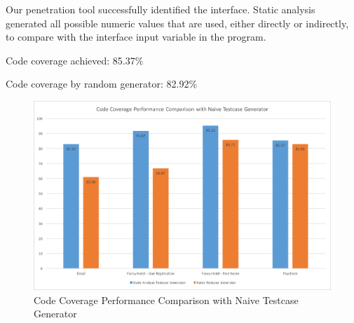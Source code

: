 Our penetration tool successfully identified the interface. Static analysis generated all possible numeric values that are used, either directly or indirectly, to compare with the interface input variable in the program.

Code coverage achieved: 85.37\%

Code coverage by random generator: 82.92\%

\begin{figure}
\begin{minipage}{\textwidth}
\includegraphics[width=\textwidth]{figures/result.png}
\caption{Code Coverage Performance Comparison with Naive Testcase Generator}
\label{fig:result}
\end{minipage}
\end{figure}

